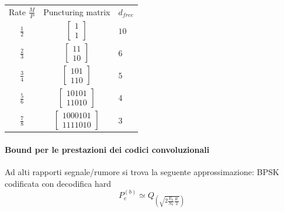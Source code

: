                 \begin{table}[H]
                    \centering
                    \begin{tabular}{ccl}
                    \cline{1-3}
                    Rate $\frac{M}{P}$ & Puncturing matrix & $d_{free}$ \\ \cline{1-3}
                    $\frac{1}{2}$ &  $\begin{bmatrix}1\\1\end{bmatrix}$ &$10$\\
                    $\frac{2}{3}$ &  $\begin{bmatrix}11\\10\end{bmatrix}$ &$6$\\
                    $\frac{3}{4}$ &  $\begin{bmatrix}101\\110\end{bmatrix}$ &$5$\\
                    $\frac{5}{6}$ &  $\begin{bmatrix}10101\\11010\end{bmatrix}$ &$4$\\
                    $\frac{7}{8}$ &  $\begin{bmatrix}1000101\\1111010\end{bmatrix}$ &$3$
                    \end{tabular}
                \end{table}
            \paragraph{Bound per le prestazioni dei codici convoluzionali}
                Ad alti rapporti segnale/rumore si trova la seguente approssimazione: BPSK codificata con 
                decodifica hard
                \[
                    P_e^{(b)} \simeq Q_{\displaystyle \left(\sqrt{2\frac{E_b}{N_0}\frac{R^\prime}{2}}\right)}  
                \] 